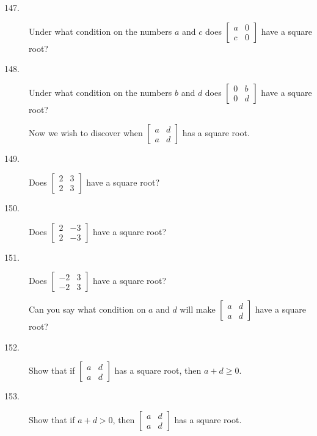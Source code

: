 \documentclass{article}
\begin{document}
\begin{description}

  \item[147.] Under what condition on the numbers $a$ and $c$ does $\begin{bmatrix} a & 0 \\ c & 0 \end{bmatrix}$ have a square root?

  \item[148.] Under what condition on the numbers $b$ and $d$ does $\begin{bmatrix} 0 & b \\ 0 & d \end{bmatrix}$ have a square root?

  \item[] Now we wish to discover when $\begin{bmatrix} a & d \\ a & d \end{bmatrix}$ has a square root.

  \item[149.] Does $\begin{bmatrix} 2 & 3 \\ 2 & 3 \end{bmatrix}$ have a square root?

  \item[150.] Does $\begin{bmatrix} 2 & -3 \\ 2 & -3 \end{bmatrix}$ have a square root?

  \item[151.] Does $\begin{bmatrix} -2 & 3 \\ -2 & 3 \end{bmatrix}$ have a square root?

  \item[] Can you say what condition on $a$ and $d$ will make $\begin{bmatrix} a & d \\ a & d \end{bmatrix}$ have a square root?

  \item[152.] Show that if $\begin{bmatrix} a & d \\ a & d \end{bmatrix}$ has a square root, then $a+d \geq 0$.

  \item[153.] Show that if $a+d > 0$, then $\begin{bmatrix} a & d \\ a & d \end{bmatrix}$ has a square root.


\end{description}
\end{document}
